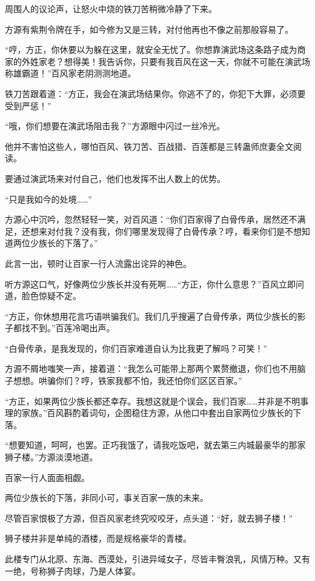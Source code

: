 \begin{this_body}
周围人的议论声，让怒火中烧的铁刀苦稍微冷静了下来。

方源有紫荆令牌在手，如今修为又是三转，对付他再也不像之前那般容易了。

“哼，方正，你休要以为躲在这里，就安全无忧了。你想靠演武场这条路子成为商家的外姓家老？想得美！我告诉你，只要有我百风在这一天，你就不可能在演武场称雄霸道！”百风家老阴测测地道。

铁刀苦跟着道：“方正，我会在演武场结果你。你逃不了的，你犯下大罪，必须要受到严惩！”

“哦，你们想要在演武场阻击我？”方源眼中闪过一丝冷光。

他并不害怕这些人，哪怕百风、铁刀苦、百战猎、百莲都是三转蛊师庶妻全文阅读。

要通过演武场来对付自己，他们也发挥不出人数上的优势。

“只是我如今的处境……”

方源心中沉吟，忽然轻轻一笑，对百风道：“你们百家得了白骨传承，居然还不满足，还想来对付我？没有我，你们哪里发现得了白骨传承？哼，看来你们是不想知道两位少族长的下落了。”

此言一出，顿时让百家一行人流露出诧异的神色。

听方源这口气，好像两位少族长并没有死啊……“方正，你什么意思？”百风立即问道，脸色惊疑不定。

“方正，你休想用花言巧语哄骗我们。我们几乎搜遍了白骨传承，两位少族长的影子都找不到。”百莲冷喝出声。

“白骨传承，是我发现的，你们百家难道自认为比我更了解吗？可笑！”

方源不屑地嗤笑一声，接着道：“我怎么可能带上那两个累赘撤退，你们也不用脑子想想。哄骗你们？哼，铁家我都不怕，我还怕你们区区百家。”

“方正，如果两位少族长都还幸存。我想这就是个误会，我们百家……并非是不明事理的家族。”百风斟酌着词句，企图稳住方源，从他口中套出自家两位少族长的下落。

“想要知道，呵呵，也罢。正巧我饿了，请我吃饭吧，就去第三内城最豪华的那家狮子楼。”方源淡漠地道。

百家一行人面面相觑。

两位少族长的下落，非同小可，事关百家一族的未来。

尽管百家恨极了方源，但百风家老终究咬咬牙，点头道：“好，就去狮子楼！”

狮子楼并非是单纯的酒楼，而是规格豪华的青楼。

此楼专门从北原、东海、西漠处，引进异域女子，尽皆丰臀浪乳，风情万种。又有一绝，号称狮子肉球，乃是人体宴。


\end{this_body}
